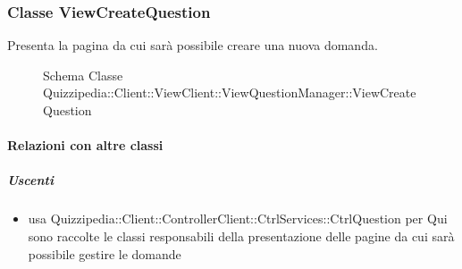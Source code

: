 \subsubsection{Classe ViewCreateQuestion}
Presenta la pagina da cui sarà possibile creare una nuova domanda.
\begin{figure}[H]
\centering
\noindent{}
\caption[Schema Classe ViewCreateQuestion]{Schema Classe Quizzipedia::Client::ViewClient::ViewQuestionManager::ViewCreateQuestion}
\end{figure}
\paragraph{Relazioni con altre classi}
\subparagraph{Uscenti}
\begin{itemize}
\item usa Quizzipedia::Client::ControllerClient::CtrlServices::CtrlQuestion per Qui sono raccolte le classi responsabili della presentazione delle pagine da cui sarà possibile gestire le domande
\end{itemize}
